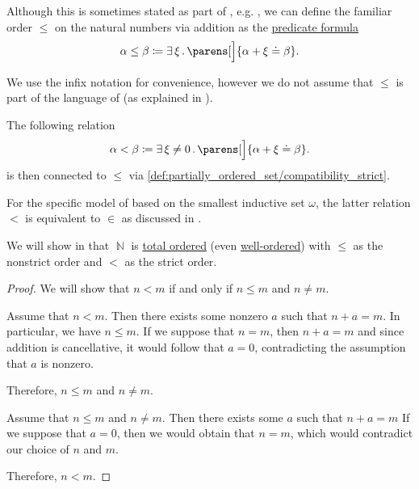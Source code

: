 \begin{definition}\label{def:natural_number_ordering}
  Although this is sometimes stated as part of , e.g. \cite[exmpl. 17.6]{OpenLogicFull}, we can define the familiar order \( \leq \) on the natural numbers via addition as the \hyperref[rem:predicate_formula]{predicate formula}
  \begin{equation}\label{eq:def:natural_number_ordering/predicate}
    \alpha \leq \beta \coloneqq \qexists \xi \parens[\Big]{ \alpha + \xi \doteq \beta }.
  \end{equation}

  We use the infix notation for convenience, however we do not assume that \( \leq \) is part of the language of  (as explained in ).

  The following relation
  \begin{equation}\label{eq:def:natural_number_ordering/strict_predicate}
    \alpha < \beta \coloneqq \qexists {\xi \neq 0} \parens[\Big]{ \alpha + \xi \doteq \beta }.
  \end{equation}
  is then connected to \( \leq \) via \eqref{def:partially_ordered_set/compatibility_strict}.

  For the specific model of  based on the smallest inductive set \( \omega \), the latter relation \( < \) is equivalent to \( \in \) as discussed in .

  We will show in  that \( \BbbN \) is \hyperref[def:totally_ordered_set]{total ordered} (even \hyperref[def:well_ordered_set]{well-ordered}) with \( \leq \) as the nonstrict order and \( < \) as the strict order.
\end{definition}
\begin{proof}
  We will show that \( n < m \) if and only if \( n \leq m \) and \( n \neq m \).

  \SufficiencySubProof Assume that \( n < m \). Then there exists some nonzero \( a \) such that \( n + a = m \). In particular, we have \( n \leq m \). If we suppose that \( n = m \), then \( n + a = m \) and since addition is cancellative, it would follow that \( a = 0 \), contradicting the assumption that \( a \) is nonzero.

  Therefore, \( n \leq m \) and \( n \neq m \).

  \NecessitySubProof Assume that \( n \leq m \) and \( n \neq m \). Then there exists some \( a \) such that \( n + a = m \) If we suppose that \( a = 0 \), then we would obtain that \( n = m \), which would contradict our choice of \( n \) and \( m \).

  Therefore, \( n < m \).
\end{proof}


